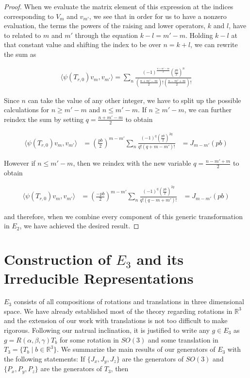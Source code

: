 \documentclass[10pt]{ucthesis}
\newcommand{\R}{\mathbb{R}}
\begin{document}
\begin{proof}
When we evaluate the matrix element of this expression at the indices corresponding to $V_m$ and $v_{m'}$, we see that in order for us to have a nonzero evaluation, the terms the powers of the raising and lower operators, $k$ and $l$, have to related to $m$ and $m'$ through the equation $k-l=m'-m$. Holding $k-l$ at that constant value and shifting the index to be over $n=k+l$, we can rewrite the sum as

\begin{equation}
\begin{aligned}
 \langle \psi(T_{r,0})v_m , v_{m'} \rangle = \sum_n \frac{(-1)^\frac{n+m'-m}{2}(\frac{pb}{2})^n}{(\frac{n+m'-m}{2})!(\frac{n-m'+m}{2})!}
\end{aligned}
\end{equation}

Since $n$ can take the value of any other integer, we have to split up the possible calculations for $n\geq m'-m$ and $n\leq m'-m$. If $n\geq m'-m$, we can further reindex the sum by setting $q=\frac{n+m'-m}{2}$ to obtain

\begin{equation}
\begin{aligned}
 \langle \psi(T_{r,0})v_m , v_{m'} \rangle &= \left(\frac{pb}{2}\right)^{m-m'}\sum_n \frac{(-1)^q(\frac{pb}{2})^{2q}}{q!(q+m-m')!} &= J_{m-m'}(pb)
\end{aligned}
\end{equation}

However if $n\leq m'-m$, then we reindex with the new variable $q =\frac{n-m'+m}{2}$ to obtain 

\begin{equation}
\begin{aligned}
 \langle \psi(T_{r,0})v_m , v_{m'} \rangle &= \left(\frac{-pb}{2}\right)^{m-m'}\sum_n \frac{(-1)^q(\frac{pb}{2})^{2q}}{q!(q-m+m')!} &= J_{m-m'}(pb)
\end{aligned}
\end{equation}

and therefore, when we combine every component of this generic transformation in $E_2$, we have achieved the desired result. \end{proof}

\section{Construction of $E_3$ and its Irreducible Representations}

$E_3$ consists of all compositions of rotations and translations in three dimensional space. We have already established most of the theory regarding rotations in $\R^3$ and the extension of our work with translations is not too difficult to make rigorous. Following our natrual inclination, it is justified to write any $g\in E_3$ as  $g = R(\alpha,\beta,\gamma)T_b$ for some rotation in $SO(3)$ and some translation in $T_3 = \{T_b \mid b\in\R^3\}$. We summarize the main results of our generators of $E_3$ with the following statements: If $\{J_x,J_y,J_z\}$ are the generators of $SO(3)$ and $\{P_x,P_y,P_z\}$ are the generators of $T_3$, then
\end{document}
